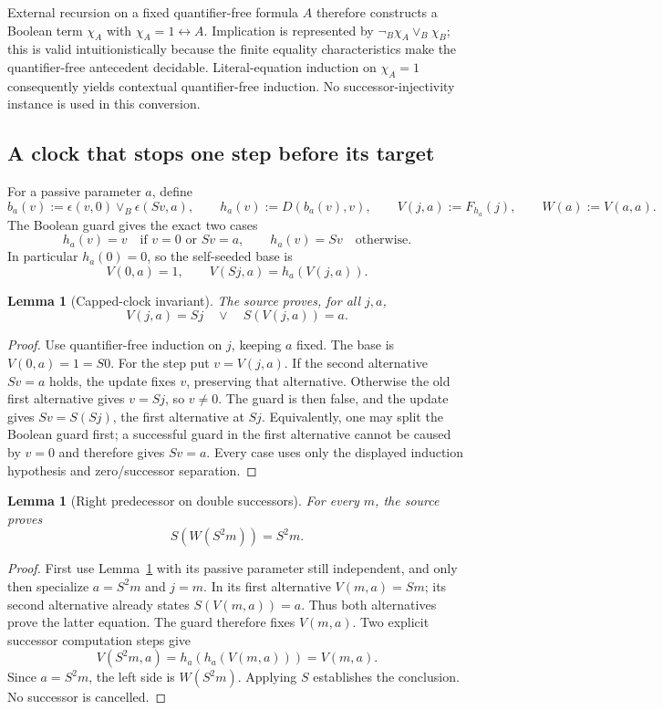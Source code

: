 \documentclass[11pt,letterpaper]{article}
\newtheorem{lemma}[theorem]{Lemma}
\theoremstyle{definition}\newtheorem{definition}[theorem]{Definition}
\theoremstyle{remark}\newtheorem{remark}[theorem]{Remark}
\begin{document}
External recursion on a fixed quantifier-free formula $A$ therefore
constructs a Boolean term $\chi_A$ with $\chi_A=1\leftrightarrow A$.
Implication is represented by $\neg_B\chi_A\lor_B\chi_B$; this is valid
intuitionistically because the finite equality characteristics make the
quantifier-free antecedent decidable. Literal-equation induction on
$\chi_A=1$ consequently yields contextual quantifier-free induction.
No successor-injectivity instance is used in this conversion.

\subsection{A clock that stops one step before its target}

For a passive parameter $a$, define
\[
 b_a(v):=\epsilon(v,0)\lor_B\epsilon(Sv,a),\qquad
 h_a(v):=D(b_a(v),v),\qquad
 V(j,a):=F_{h_a}(j),\qquad W(a):=V(a,a).
\]
The Boolean guard gives the exact two cases
\[
 h_a(v)=v\quad\text{if }v=0\text{ or }Sv=a,\qquad
 h_a(v)=Sv\quad\text{otherwise}.
\]
In particular $h_a(0)=0$, so the self-seeded base is
\[
 V(0,a)=1,\qquad V(Sj,a)=h_a(V(j,a)).
\]

\begin{lemma}[Capped-clock invariant]
\label{lem:rp-clock}
The source proves, for all $j,a$,
\[
                       V(j,a)=Sj\quad\lor\quad S(V(j,a))=a.
\]
\end{lemma}
\begin{proof}
Use quantifier-free induction on $j$, keeping $a$ fixed. The base is
$V(0,a)=1=S0$. For the step put $v=V(j,a)$. If the second alternative
$Sv=a$ holds, the update fixes $v$, preserving that alternative. Otherwise
the old first alternative gives $v=Sj$, so $v\ne0$. The guard is then
false, and the update gives $Sv=S(Sj)$, the first alternative at $Sj$.
Equivalently, one may split the Boolean guard first; a successful guard
in the first alternative cannot be caused by $v=0$ and therefore gives
$Sv=a$. Every case uses only the displayed induction hypothesis and
zero/successor separation.
\end{proof}

\begin{lemma}[Right predecessor on double successors]
\label{lem:rp-double}
For every $m$, the source proves
\[
                         S(W(S^2m))=S^2m.
\]
\end{lemma}
\begin{proof}
First use Lemma~\ref{lem:rp-clock} with its passive parameter still
independent, and only then specialize $a=S^2m$ and $j=m$. In its first
alternative $V(m,a)=Sm$; its second alternative already states
$S(V(m,a))=a$. Thus both alternatives prove the latter equation.
The guard therefore fixes $V(m,a)$. Two explicit successor computation
steps give
\[
 V(S^2m,a)=h_a(h_a(V(m,a)))=V(m,a).
\]
Since $a=S^2m$, the left side is $W(S^2m)$. Applying $S$ establishes
the conclusion. No successor is cancelled.
\end{proof}
\end{document}
